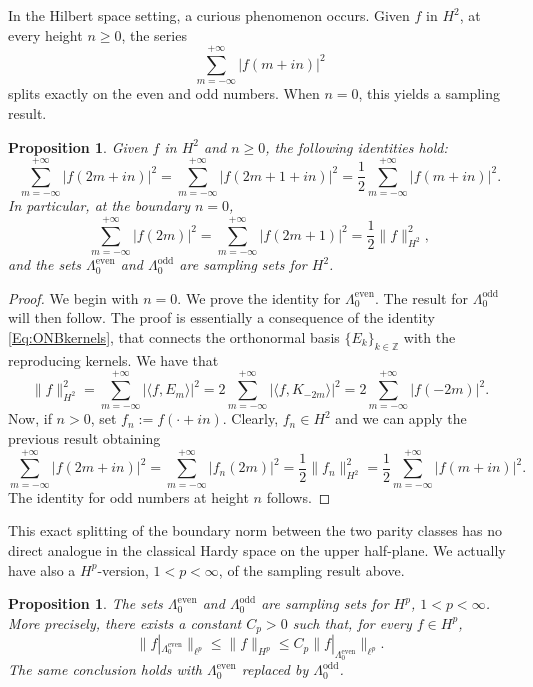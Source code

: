 \documentclass[12pt,a4paper,reqno]{amsart}
\newtheorem{prop}[thm]{Proposition}
\theoremstyle{definition}
\theoremstyle{definition}\newtheorem{defn}[thm]{Definition}
\begin{document}
In the Hilbert space setting, a curious phenomenon occurs. Given $f$ in $H^2$, at every height $n\geqslant 0$, the series 
\[
\sum_{m=-\infty}^{+\infty}|f(m+in)|^2
\]
  splits exactly on the even and odd numbers. When $n=0$, this yields a sampling result.    

    \begin{prop}\label{p:sampling} Given $f$ in $H^2$ and $n\geqslant 0$, the following identities hold:
     \[
    \sum_{m=-\infty}^{+\infty} |f(2m+in)|^2=\sum_{m=-\infty}^{+\infty}|f(2m+1+in)|^2=\frac12\sum_{m=-\infty}^{+\infty}|f(m+in)|^2.
     \]
     In particular, at the boundary $n=0$,
     \[
     \sum_{m=-\infty}^{+\infty} |f(2m)|^2=\sum_{m=-\infty}^{+\infty}|f(2m+1)|^2=\frac12\|f\|_{H^2}^2,
     \]
     and the sets $\Lambda^{\operatorname{even}}_{0}$ and $\Lambda^{\operatorname{odd}}_{0}$ are sampling sets for $H^2$.  
    \end{prop}
    \begin{proof}
   We begin with $n=0$. We prove the identity for $\Lambda^{\operatorname{even}}_0$. The result for $\Lambda^{\operatorname{odd}}_0$ will then follow. The proof is essentially a consequence of the identity \eqref{Eq:ONBkernels}, that connects the orthonormal basis $\{E_k\}_{k\in\mathbb{Z}}$ with the reproducing kernels. We have that
    \[
    \|f\|_{H^2}^2=\sum_{m=-\infty}^{+\infty}|\langle f,E_m\rangle|^2=2\sum_{m=-\infty}^{+\infty}|\langle f,K_{-2m}\rangle|^2=2\sum_{m=-\infty}^{+\infty}|f(-2m)|^2.
    \]
    Now, if $n> 0$, set $f_n:=f(\cdot+in)$. Clearly, $f_n\in H^2$ and we can apply the previous result obtaining
    \[
    \sum_{m=-\infty}^{+\infty} |f(2m+in)|^2=\sum_{m=-\infty}^{+\infty} |f_n(2m)|^2=\frac12\|f_n\|_{H^2}^2=\frac12\sum_{m=-\infty}^{+\infty}|f(m+in)|^2.
    \]
    The identity for odd numbers at height $n$ follows.
    
    
    \end{proof}
    This exact splitting of the boundary norm between the two parity classes has 
    no direct analogue in the classical Hardy space on the upper half-plane. We actually have also a $H^p$-version, $1<p<\infty$, of the sampling result above.
    \begin{prop}\label{p:sampling_Hp}
    The sets $\Lambda^{\operatorname{even}}_0$ and
    $\Lambda^{\operatorname{odd}}_0$ are sampling sets for $H^p$,
    $1<p<\infty$. More precisely, there exists a constant $C_p>0$ such that,
    for every $f\in H^p$,
    \[
    \|f|_{\Lambda^{\operatorname{even}}_0}\|_{\ell^p}
    \leqslant
    \|f\|_{H^p}
    \leqslant
    C_p\|f|_{\Lambda^{\operatorname{even}}_0}\|_{\ell^p}.
    \]
    The same conclusion holds with $\Lambda^{\operatorname{even}}_0$ replaced by
    $\Lambda^{\operatorname{odd}}_0$.
    \end{prop}
    
\end{document}
